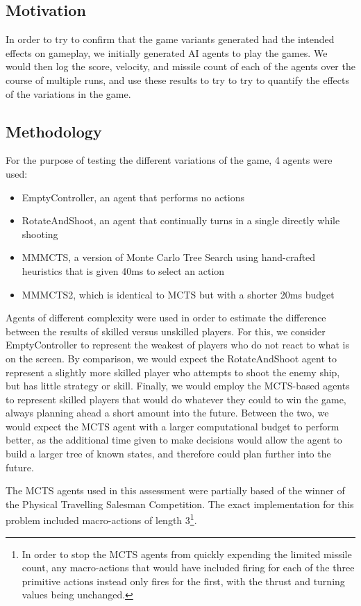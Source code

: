 \subsection{Motivation}

In order to try to confirm that the game variants generated had the intended effects on gameplay, we initially generated AI agents to play the games. We would then log the score, velocity, and missile count of each of the agents over the course of multiple runs, and use these results to try to try to quantify the effects of the variations in the game.

\subsection{Methodology}

For the purpose of testing the different variations of the game, 4 agents were used:
\begin{itemize}
	\item EmptyController, an agent that performs no actions
	\item RotateAndShoot, an agent that continually turns in a single directly while shooting
	\item MMMCTS, a version of Monte Carlo Tree Search using hand-crafted heuristics that is given 40ms to select an action
	\item MMMCTS2, which is identical to MCTS but with a shorter 20ms budget
\end{itemize}

Agents of different complexity were used in order to estimate the difference between the results of skilled versus unskilled players. For this, we consider EmptyController to represent the weakest of players who do not react to what is on the screen. By comparison, we would expect the RotateAndShoot agent to represent a slightly more skilled player who attempts to shoot the enemy ship, but has little strategy or skill. Finally, we would employ the MCTS-based agents to represent skilled players that would do whatever they could to win the game, always planning ahead a short amount into the future. Between the two, we would expect the MCTS agent with a larger computational budget to perform better, as the additional time given to make decisions would allow the agent to build a larger tree of known states, and therefore could plan further into the future.

The MCTS agents used in this assessment were partially based of the winner of the Physical Travelling Salesman Competition\cite{6374161}. The exact implementation for this problem included macro-actions of length 3\footnote{In order to stop the MCTS agents from quickly expending the limited missile count, any macro-actions that would have included firing for each of the three primitive actions instead only fires for the first, with the thrust and turning values being unchanged.}. 

